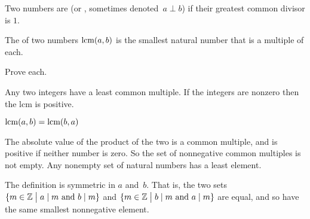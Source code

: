 \documentclass{test}  %
\begin{document}
\begin{df}
Two numbers are  
(or , sometimes denoted~$a\perp b$) if their 
greatest common divisor is $1$.
\end{df}

\begin{df}
The  of two numbers $\operatorname{lcm}(a,b)$ 
is the smallest natural number that is a multiple of each.
\end{df}

\begin{problem} Prove each.
\begin{items}
\item {} Any two integers have a least common multiple.
  If the integers are nonzero then the lcm is positive.
\item {} $\operatorname{lcm}(a,b)=\operatorname{lcm}(b,a)$
\end{items}
\begin{answer}
\begin{items}
\item The absolute value of the product of the two is a common multiple,
  and is positive if neither number is zero.
  So the set of nonnegative common multiples is not empty.
  Any nonempty set of natural numbers has a least element.
\item The definition is symmetric in $a$ and~$b$.
  That is, the two sets
  $\{m\in\mathbb{Z} \bigm| \text{$a\mid m$ and $b\mid m$}\}$
  and     
  $\{m\in\mathbb{Z} \bigm| \text{$b\mid m$ and $a\mid m$}\}$
  are equal, and so have the same smallest nonnegative element.
\end{items}
\end{answer}
\end{problem}
\end{document}
